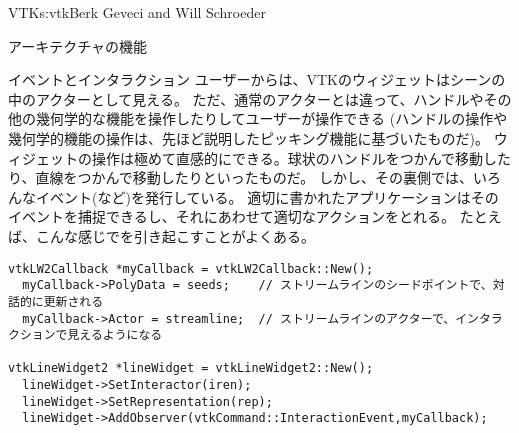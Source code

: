 \begin{aosachapter}{VTK}{s:vtk}{Berk Geveci and Will Schroeder}
\begin{aosasect1}{アーキテクチャの機能}
\begin{aosasect2}{イベントとインタラクション}
ユーザーからは、VTKのウィジェットはシーンの中のアクターとして見える。
ただ、通常のアクターとは違って、ハンドルやその他の幾何学的な機能を操作したりしてユーザーが操作できる
(ハンドルの操作や幾何学的機能の操作は、先ほど説明したピッキング機能に基づいたものだ)。
ウィジェットの操作は極めて直感的にできる。球状のハンドルをつかんで移動したり、直線をつかんで移動したりといったものだ。
しかし、その裏側では、いろんなイベント(など)を発行している。
適切に書かれたアプリケーションはそのイベントを捕捉できるし、それにあわせて適切なアクションをとれる。
たとえば、こんな感じでを引き起こすことがよくある。


\begin{verbatim}
vtkLW2Callback *myCallback = vtkLW2Callback::New();
  myCallback->PolyData = seeds;    // ストリームラインのシードポイントで、対話的に更新される
  myCallback->Actor = streamline;  // ストリームラインのアクターで、インタラクションで見えるようになる

vtkLineWidget2 *lineWidget = vtkLineWidget2::New();
  lineWidget->SetInteractor(iren);
  lineWidget->SetRepresentation(rep);
  lineWidget->AddObserver(vtkCommand::InteractionEvent,myCallback);
\end{verbatim}


\end{aosasect2}
\end{aosasect1}
\end{aosachapter}
